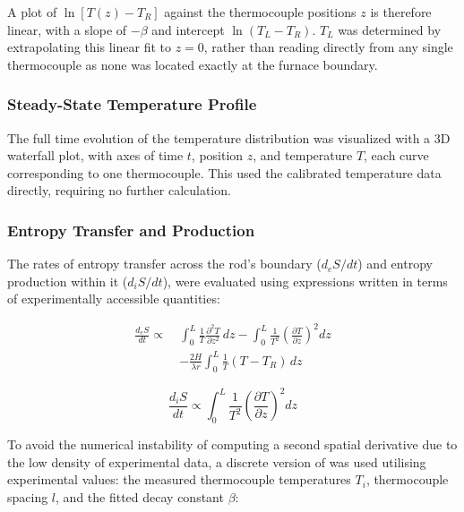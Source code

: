 \documentclass[11pt, a4paper, twocolumn]{article}
\begin{document}
A plot of $\ln[T(z)-T_R]$ against the thermocouple positions $z$ is therefore linear, with a slope of $-\beta$ and intercept $\ln(T_L-T_R)$. $T_L$ was determined by extrapolating this linear fit to $z=0$, rather than reading directly from any single thermocouple as none was located exactly at the furnace boundary.

\subsubsection{Steady-State Temperature Profile}

The full time evolution of the temperature distribution was visualized with a 3D waterfall plot, with axes of time $t$, position $z$, and temperature $T$, each curve corresponding to one thermocouple. This used the calibrated temperature data directly, requiring no further calculation.

\subsubsection{Entropy Transfer and Production} \label{sec:2.3.3}

The rates of entropy transfer across the rod's boundary ($d_eS/dt$) and entropy production within it ($d_iS/dt$), were evaluated using expressions written in terms of experimentally accessible quantities:

\vspace{-3ex}
\begin{equation} \label{eq:9}
\begin{split}
\frac{d_eS}{dt} \propto\ 
&\int_0^L \frac{1}{T}\frac{\partial^2 T}{\partial z^2}\,dz 
- \int_0^L \frac{1}{T^2}\left(\frac{\partial T}{\partial z}\right)^2 dz \\
&- \frac{2H}{\lambda r}\int_0^L \frac{1}{T}(T-T_R)\,dz
\end{split}
\end{equation}

\begin{equation} \label{eq:10}
  \frac{d_i S}{dt} \propto \int^L_0 \frac{1}{T^2} \left( \frac{\partial T}{\partial z} \right)^2 dz
\end{equation}

To avoid the numerical instability of computing a second spatial derivative due to the low density of experimental data, a discrete version of  was used utilising experimental values: the measured thermocouple temperatures $T_i$, thermocouple spacing $l$, and the fitted decay constant $\beta$:
\end{document}
